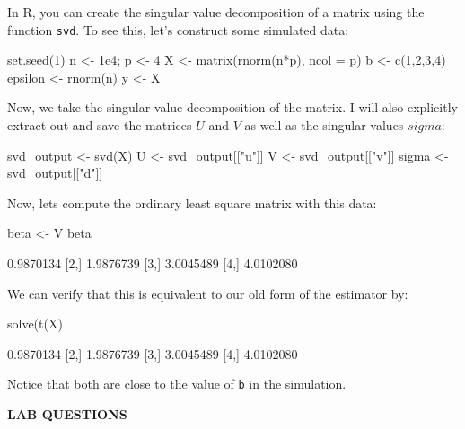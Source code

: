\documentclass[12pt,hidelinks]{article}
\numberwithin{equation}{section}
\begin{document}
In R, you can create the singular value decomposition of a matrix using the
function \texttt{svd}. To see this, let's construct some simulated data:
\begin{rcode}
set.seed(1)
n <- 1e4; p <- 4
X <- matrix(rnorm(n*p), ncol = p)
b <- c(1,2,3,4)
epsilon <- rnorm(n)
y <- X %
\end{rcode}
Now, we take the singular value decomposition of the matrix. I will also
explicitly extract out and save the matrices $U$ and $V$ as well as the singular
values $sigma$:
\begin{rcode}
svd_output <- svd(X)
U <- svd_output[["u"]]
V <- svd_output[["v"]]
sigma <- svd_output[["d"]]
\end{rcode}
Now, lets compute the ordinary least square matrix with this data:
\begin{rcode}
beta <- V %
beta
\end{rcode}
\begin{rres}
          [,1]
[1,] 0.9870134
[2,] 1.9876739
[3,] 3.0045489
[4,] 4.0102080
\end{rres}
We can verify that this is equivalent to our old form of the estimator by:
\begin{rcode}
solve(t(X) %
\end{rcode}
\begin{rres}
          [,1]
[1,] 0.9870134
[2,] 1.9876739
[3,] 3.0045489
[4,] 4.0102080
\end{rres}
Notice that both are close to the value of \texttt{b} in the simulation.

\newpage

\textbf{LAB QUESTIONS}

\vspace*{0pt}
\end{document}
